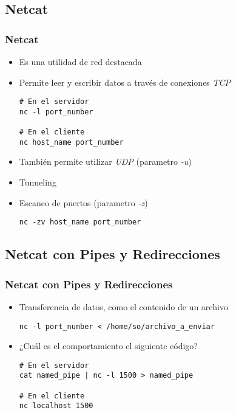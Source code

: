 \subsection{Netcat}
\begin{frame}[fragile]
  \frametitle{Netcat}
  \begin{itemize}
    \item Es una utilidad de red destacada
    \item Permite leer y escribir datos a través de conexiones \textit{TCP}
      \begin{lstlisting}
# En el servidor
nc -l port_number

# En el cliente
nc host_name port_number
      \end{lstlisting}
    \item También permite utilizar \textit{UDP} (parametro \textit{-u})
    \item Tunneling
    \item Escaneo de puertos (parametro \textit{-z})
      \begin{lstlisting}	
nc -zv host_name port_number
      \end{lstlisting}
  \end{itemize}
\end{frame}

\subsection{Netcat con Pipes y Redirecciones}
\begin{frame}[fragile]
  \frametitle{Netcat con Pipes y Redirecciones}
  \begin{itemize}
    \item Transferencia de datos, como el contenido de un archivo
      \begin{lstlisting}	
nc -l port_number < /home/so/archivo_a_enviar
      \end{lstlisting}
    \item ¿Cuál es el comportamiento el siguiente código?
      \begin{lstlisting}
# En el servidor
cat named_pipe | nc -l 1500 > named_pipe

# En el cliente
nc localhost 1500
      \end{lstlisting}
  \end{itemize}
\end{frame}